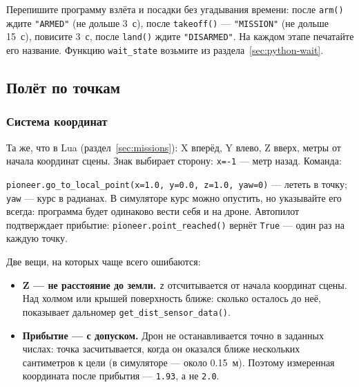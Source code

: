 \begin{taskbox}
Перепишите программу взлёта и посадки без угадывания времени: после \verb|arm()| ждите \verb|"ARMED"| (не дольше 3~с), после \verb|takeoff()| --- \verb|"MISSION"| (не дольше 15~с), повисите 3~с, после \verb|land()| ждите \verb|"DISARMED"|. На каждом этапе печатайте его название. Функцию \verb|wait_state| возьмите из раздела~\ref{sec:python-wait}.
\end{taskbox}

\subsection{Полёт по точкам}

\subsubsection*{Система координат}

Та же, что в Lua (раздел~\ref{sec:missions}): X вперёд, Y влево, Z вверх, метры от начала координат сцены. Знак выбирает сторону: \verb|x=-1| --- метр назад. Команда:

\begin{codebox}
\verb|pioneer.go_to_local_point(x=1.0, y=0.0, z=1.0, yaw=0)| --- лететь в точку; \verb|yaw| --- курс в радианах. В симуляторе курс можно опустить, но указывайте его всегда: программа будет одинаково вести себя и на дроне. Автопилот подтверждает прибытие: \verb|pioneer.point_reached()| вернёт \verb|True| --- один раз на каждую точку.
\end{codebox}

Две вещи, на которых чаще всего ошибаются:
\begin{itemize}
    \item \textbf{Z --- не расстояние до земли.} \verb|z| отсчитывается от начала координат сцены. Над холмом или крышей поверхность ближе: сколько осталось до неё, показывает дальномер \verb|get_dist_sensor_data()|.
    \item \textbf{Прибытие --- с допуском.} Дрон не останавливается точно в заданных числах: точка засчитывается, когда он оказался ближе нескольких сантиметров к цели (в симуляторе --- около 0.15~м). Поэтому измеренная координата после прибытия --- \verb|1.93|, а не \verb|2.0|.
\end{itemize}

